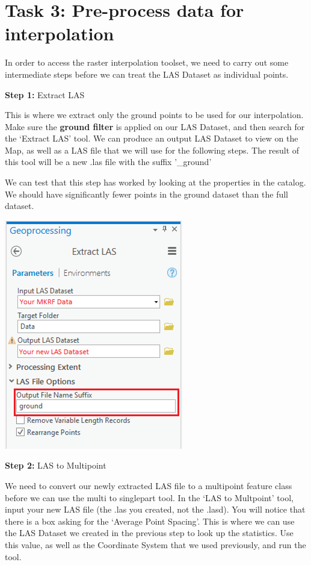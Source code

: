 \documentclass[
]{book}
\begin{document}
\hypertarget{task-3-pre-process-data-for-interpolation}{%
\section*{Task 3: Pre-process data for interpolation}\label{task-3-pre-process-data-for-interpolation}}

In order to access the raster interpolation toolset, we need to carry out some intermediate steps before we can treat the LAS Dataset as individual points.

\textbf{Step 1:} Extract LAS

This is where we extract only the ground points to be used for our interpolation. Make sure the \textbf{ground filter} is applied on our LAS Dataset, and then search for the `Extract LAS' tool. We can produce an output LAS Dataset to view on the Map, as well as a LAS file that we will use for the following steps. The result of this tool will be a new .las file with the suffix '\_ground'

We can test that this step has worked by looking at the properties in the catalog. We should have significantly fewer points in the ground dataset than the full dataset.

\begin{center}\includegraphics[width=0.4\linewidth]{images/04-extract-ground-points} \end{center}

\textbf{Step 2:} LAS to Multipoint

We need to convert our newly extracted LAS file to a multipoint feature class before we can use the multi to singlepart tool. In the `LAS to Multpoint' tool, input your new LAS file (the .las you created, not the .lasd). You will notice that there is a box asking for the `Average Point Spacing'. This is where we can use the LAS Dataset we created in the previous step to look up the statistics. Use this value, as well as the Coordinate System that we used previously, and run the tool.
\end{document}

